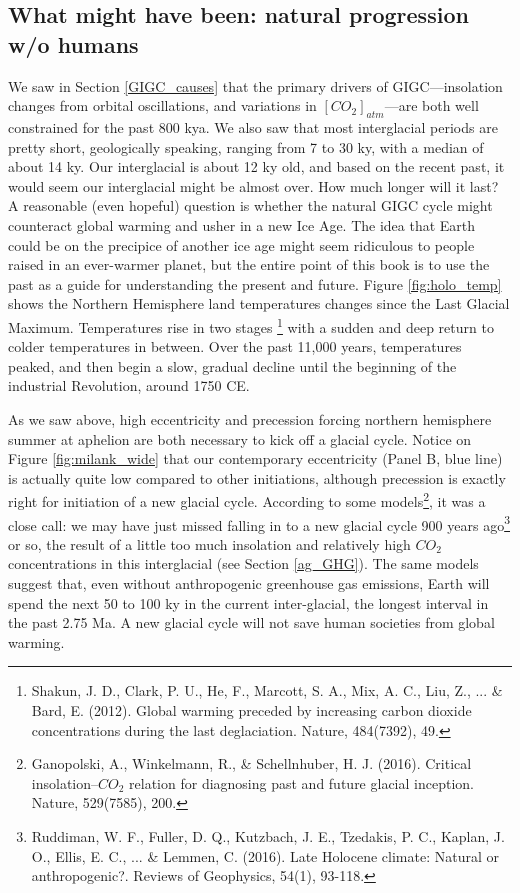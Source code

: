 \documentclass[amstex,12pt]{book}
\begin{document}
\subsection{What might have been: natural progression w/o humans}
We saw in Section \ref{GIGC_causes} that the primary drivers of GIGC---insolation changes from orbital oscillations, and variations in $[CO_2]_{atm}$---are both well constrained for the past 800 kya. We also saw that most interglacial periods are pretty short, geologically speaking, ranging from 7 to 30 ky, with a median of about 14 ky. Our interglacial is about 12 ky old, and based on the recent past, it would seem our interglacial might be almost over. How much longer will it last? A reasonable (even hopeful) question is whether the natural GIGC cycle might counteract global warming and usher in a new Ice Age. The idea that Earth could be on the precipice of another ice age might seem ridiculous to people raised in an ever-warmer planet, but the entire point of this book is to use the past as a guide for understanding the present and future. Figure \ref{fig:holo_temp} shows the Northern Hemisphere land temperatures changes since the Last Glacial Maximum. Temperatures rise in two stages \footnote{Shakun, J. D., Clark, P. U., He, F., Marcott, S. A., Mix, A. C., Liu, Z., ... \& Bard, E. (2012). Global warming preceded by increasing carbon dioxide concentrations during the last deglaciation. Nature, 484(7392), 49.} with a sudden and deep return to colder temperatures in between. Over the past 11,000 years, temperatures peaked, and then begin a slow, gradual decline until the beginning of the industrial Revolution, around 1750 CE.

As we saw above, high eccentricity and precession forcing northern hemisphere summer at aphelion are both necessary to kick off a glacial cycle. Notice on Figure \ref{fig:milank_wide} that our contemporary eccentricity (Panel B, blue line) is actually quite low compared to other initiations, although precession is exactly right for initiation of a new glacial cycle. According to some models\footnote{Ganopolski, A., Winkelmann, R., \& Schellnhuber, H. J. (2016). Critical insolation–$CO_2$ relation for diagnosing past and future glacial inception. Nature, 529(7585), 200.}, it was a close call: we may have just missed falling in to a new glacial cycle 900 years ago\footnote{Ruddiman, W. F., Fuller, D. Q., Kutzbach, J. E., Tzedakis, P. C., Kaplan, J. O., Ellis, E. C., ... \& Lemmen, C. (2016). Late Holocene climate: Natural or anthropogenic?. Reviews of Geophysics, 54(1), 93-118.} or so, the result of a little too much insolation and relatively high $CO_2$ concentrations in this interglacial (see Section \ref{ag_GHG}). The same models suggest that, even without anthropogenic greenhouse gas emissions, Earth will spend the next 50 to 100 ky in the current inter-glacial, the longest interval in the past 2.75 Ma. A new glacial cycle will not save human societies from global warming.          
\end{document}
